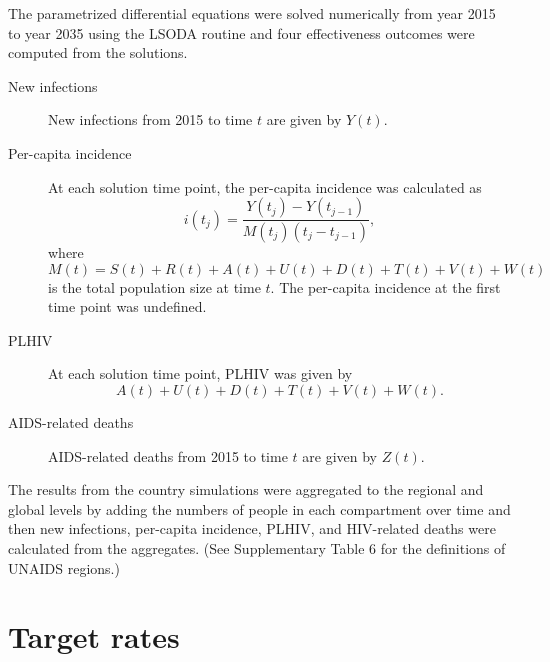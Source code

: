 \documentclass{article}
\begin{document}
The parametrized differential equations were solved numerically from
year 2015 to year 2035 using the LSODA routine
\autocite{odepack, scipy, medlock2016-git} and four effectiveness
outcomes were computed from the solutions.
\begin{description}
\item[New infections] New infections from 2015 to time $t$ are given
  by $Y(t)$.

\item[Per-capita incidence] At each solution time point, the
  per-capita incidence was calculated as
  \begin{equation}
    i(t_j) = \frac{Y(t_j) - Y(t_{j - 1})}{M(t_j) (t_j - t_{j - 1})},
  \end{equation}
  where
  \begin{equation}
    M(t) = S(t) + R(t) + A(t) + U(t) + D(t) + T(t) + V(t) + W(t)
  \end{equation}
  is the total population size at time $t$.  The per-capita incidence
  at the first time point was undefined.

\item[PLHIV] At each solution time point, PLHIV was given by
  \begin{equation}
    A(t) + U(t) + D(t) + T(t) + V(t) + W(t).
  \end{equation}

\item[AIDS-related deaths] AIDS-related deaths from 2015 to time $t$
  are given by $Z(t)$.

\end{description}

The results from the country simulations were aggregated to the
regional and global levels by adding the numbers of people in each
compartment over time and then new infections, per-capita incidence,
PLHIV, and HIV-related deaths were calculated from the aggregates.
(See Supplementary Table 6 for the definitions of UNAIDS regions.)


\section{Target rates}
\label{targets}
\end{document}
